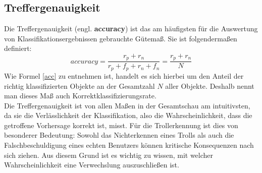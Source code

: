 \subsection{Treffergenauigkeit}
Die Treffergenauigkeit (engl. \textbf{accuracy}) ist das am häufigsten für die Auswertung von Klassifikationsergebnissen gebrauchte Gütemaß. Sie ist folgendermaßen definiert:
\begin{equation}
	accuracy = \frac{r_p + r_n}{r_p + f_p + r_n + f_n} = \frac{r_p + r_n}{N}
	\label{acc}
\end{equation}
Wie Formel \ref{acc} zu entnehmen ist, handelt es sich hierbei um den Anteil der richtig klassifizierten Objekte an der Gesamtzahl $N$ aller Objekte. Deshalb nennt man dieses Maß auch Korrektklassifizierungsrate.\\
Die Treffergenauigkeit ist von allen Maßen in der Gesamtschau am intuitivsten, da sie die Verlässlichkeit der Klassifikation, also die Wahrscheinlichkeit, dass die getroffene Vorhersage korrekt ist, misst. Für die Trollerkennung ist dies von besonderer Bedeutung: Sowohl das Nichterkennen eines Trolls als auch die \glqq Falschbeschuldigung\grqq{} eines echten Benutzers können kritische Konsequenzen nach sich ziehen. Aus diesem Grund ist es wichtig zu wissen, mit welcher Wahrscheinlichkeit eine Verwechslung auszuschließen ist. 
